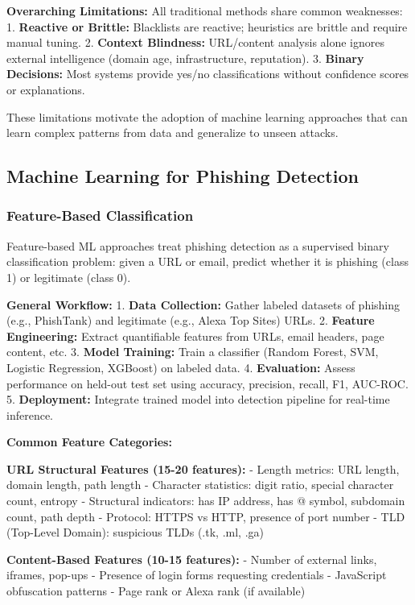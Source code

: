\textbf{Overarching Limitations:} All traditional methods share common
weaknesses: 1. \textbf{Reactive or Brittle:} Blacklists are reactive;
heuristics are brittle and require manual tuning. 2. \textbf{Context
Blindness:} URL/content analysis alone ignores external intelligence
(domain age, infrastructure, reputation). 3. \textbf{Binary Decisions:}
Most systems provide yes/no classifications without confidence scores or
explanations.

These limitations motivate the adoption of machine learning approaches
that can learn complex patterns from data and generalize to unseen
attacks.

\subsection{Machine Learning for Phishing
Detection}\label{machine-learning-for-phishing-detection}

\subsubsection{Feature-Based
Classification}\label{feature-based-classification}

Feature-based ML approaches treat phishing detection as a supervised
binary classification problem: given a URL or email, predict whether it
is phishing (class 1) or legitimate (class 0).

\textbf{General Workflow:} 1. \textbf{Data Collection:} Gather labeled
datasets of phishing (e.g., PhishTank) and legitimate (e.g., Alexa Top
Sites) URLs. 2. \textbf{Feature Engineering:} Extract quantifiable
features from URLs, email headers, page content, etc. 3. \textbf{Model
Training:} Train a classifier (Random Forest, SVM, Logistic Regression,
XGBoost) on labeled data. 4. \textbf{Evaluation:} Assess performance on
held-out test set using accuracy, precision, recall, F1, AUC-ROC. 5.
\textbf{Deployment:} Integrate trained model into detection pipeline for
real-time inference.

\textbf{Common Feature Categories:}

\textbf{URL Structural Features (15-20 features):} - Length metrics: URL
length, domain length, path length - Character statistics: digit ratio,
special character count, entropy - Structural indicators: has IP
address, has @ symbol, subdomain count, path depth - Protocol: HTTPS vs
HTTP, presence of port number - TLD (Top-Level Domain): suspicious TLDs
(.tk, .ml, .ga)

\textbf{Content-Based Features (10-15 features):} - Number of external
links, iframes, pop-ups - Presence of login forms requesting credentials
- JavaScript obfuscation patterns - Page rank or Alexa rank (if
available)

